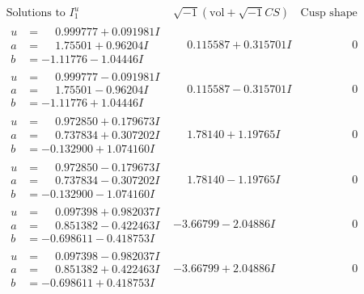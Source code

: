 \documentclass[1p]{elsarticle_modified}
\theoremstyle{definition}
\newcommand{\I}{\sqrt{-1}}
\begin{document}
$$\begin{array}{c|c|c}  
\text{Solutions to }I^u_{1}& \I (\text{vol} + \sqrt{-1}CS) & \text{Cusp shape}\\
 \hline 
\begin{aligned}
u &= \phantom{-}0.999777 + 0.091981 I \\
a &= \phantom{-}1.75501 + 0.96204 I \\
b &= -1.11776 - 1.04446 I\end{aligned}
 & \phantom{-}0.115587 + 0.315701 I & \phantom{-0.000000 } 0 \\ \hline\begin{aligned}
u &= \phantom{-}0.999777 - 0.091981 I \\
a &= \phantom{-}1.75501 - 0.96204 I \\
b &= -1.11776 + 1.04446 I\end{aligned}
 & \phantom{-}0.115587 - 0.315701 I & \phantom{-0.000000 } 0 \\ \hline\begin{aligned}
u &= \phantom{-}0.972850 + 0.179673 I \\
a &= \phantom{-}0.737834 + 0.307202 I \\
b &= -0.132900 + 1.074160 I\end{aligned}
 & \phantom{-}1.78140 + 1.19765 I & \phantom{-0.000000 } 0 \\ \hline\begin{aligned}
u &= \phantom{-}0.972850 - 0.179673 I \\
a &= \phantom{-}0.737834 - 0.307202 I \\
b &= -0.132900 - 1.074160 I\end{aligned}
 & \phantom{-}1.78140 - 1.19765 I & \phantom{-0.000000 } 0 \\ \hline\begin{aligned}
u &= \phantom{-}0.097398 + 0.982037 I \\
a &= \phantom{-}0.851382 - 0.422463 I \\
b &= -0.698611 - 0.418753 I\end{aligned}
 & -3.66799 - 2.04886 I & \phantom{-0.000000 } 0 \\ \hline\begin{aligned}
u &= \phantom{-}0.097398 - 0.982037 I \\
a &= \phantom{-}0.851382 + 0.422463 I \\
b &= -0.698611 + 0.418753 I\end{aligned}
 & -3.66799 + 2.04886 I & \phantom{-0.000000 } 0 \\ \hline\begin{aligned}

\end{aligned}
\end{array}$$
\end{document}
